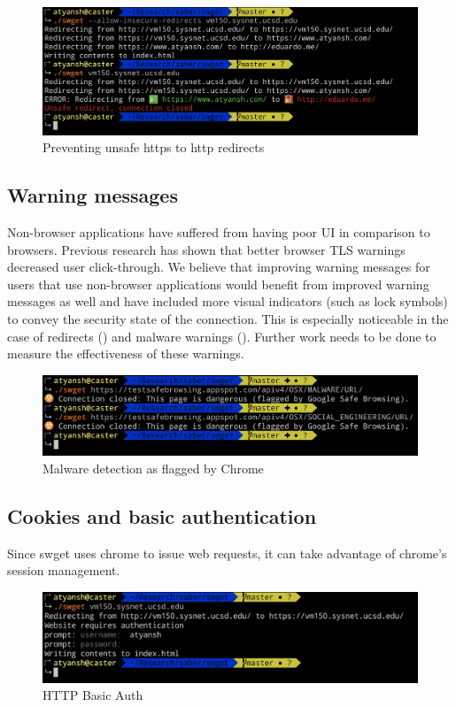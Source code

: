 \begin{figure}[h]
  \includegraphics[width=\textwidth]{figures/redirect}
  \caption{Preventing unsafe https to http redirects} 
  \label{fig:redirect-saber}
\end{figure}

\subsection{Warning messages}
Non-browser applications have suffered from having poor UI in comparison to
browsers. Previous research has shown that better browser TLS warnings
decreased user click-through. We believe that improving warning messages for
users that use non-browser applications would benefit from improved warning
messages as well and have included more visual indicators (such as lock symbols)
to convey the security state of the connection. This is especially noticeable
in the case of redirects () and malware warnings
(). Further work needs to be done to measure the
effectiveness of these warnings.

\begin{figure}[h]
  \includegraphics[width=\textwidth]{figures/malware}
  \caption{Malware detection as flagged by Chrome} 
  \label{fig:malware-saber}
\end{figure}

\subsection{Cookies and basic authentication}
Since swget uses chrome to issue web requests, it can take advantage of chrome's
session management.

\begin{figure}[h]
  \includegraphics[width=\textwidth]{figures/basic-auth}
  \caption{HTTP Basic Auth} 
  \label{fig:basic-auth-saber}
\end{figure}


